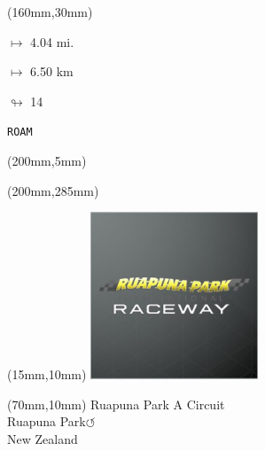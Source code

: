 \begin{textblock*}{40mm}(160mm,30mm)%
\Large
\par$\mapsto$ 4.04 mi.
\par$\mapsto$ 6.50 km
\par$\looparrowright$ 14
\par\hfill\tiny\tt ROAM\\
\end{textblock*}
\begin{textblock*}{20mm}(200mm,5mm)%
\fbox{\thepage}
\label{ROAM}
\end{textblock*}
\begin{textblock*}{20mm}(200mm,285mm)%
\fbox{\thepage}
\end{textblock*}

\null\newpage
\begin{textblock*}{50mm}(15mm,10mm)%
\includegraphics[width=50mm]{LG/RUPU.png}
\end{textblock*}
\begin{textblock*}{130mm}(70mm,10mm)%
{\fontsize{20}{20}\selectfont Ruapuna Park A Circuit\\}
{\fontsize{16}{16}\selectfont Ruapuna Park\hfill \huge$\circlearrowleft$\\}
{\fontsize{12}{12}\selectfont New Zealand\\}
\end{textblock*}
